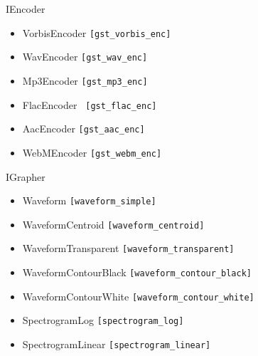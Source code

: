 \documentclass[10pt, final, hyperref, table]{beamer}
\begin{document}
\begin{frame}
   \begin{minipage}{0.5\linewidth}
      \begin{block}{IEncoder}
      \begin{itemize}
      \item VorbisEncoder \texttt{[gst\_vorbis\_enc]}
      \item WavEncoder \texttt{[gst\_wav\_enc]}
      \item Mp3Encoder \texttt{[gst\_mp3\_enc]}
      \item FlacEncoder \texttt{ [gst\_flac\_enc]}
      \item AacEncoder \texttt{[gst\_aac\_enc]}
      \item WebMEncoder \texttt{[gst\_webm\_enc]}
      \end{itemize}
    \end{block}
  \begin{block}{IGrapher}
      \begin{itemize}
      \item Waveform \texttt{[waveform\_simple]}
      \item WaveformCentroid \texttt{[waveform\_centroid]}
      \item \alert{WaveformTransparent} \texttt{[waveform\_transparent]}
      \item WaveformContourBlack \texttt{[waveform\_contour\_black]}
      \item WaveformContourWhite \texttt{[waveform\_contour\_white]}
      \item SpectrogramLog \texttt{[spectrogram\_log]}
      \item \alert{SpectrogramLinear} \texttt{[spectrogram\_linear]}
      \end{itemize}
    \end{block}
   \end{minipage}

\end{frame}
\end{document}
